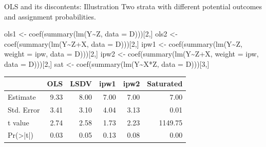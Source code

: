 \documentclass[
  11pt,
  ignorenonframetext,
]{beamer}
\newenvironment{Shaded}{\begin{snugshade}}{\end{snugshade}}
\newcommand{\AttributeTok}[1]{\textcolor[rgb]{0.40,0.45,0.13}{#1}}
\newcommand{\DecValTok}[1]{\textcolor[rgb]{0.68,0.00,0.00}{#1}}
\newcommand{\FunctionTok}[1]{\textcolor[rgb]{0.28,0.35,0.67}{#1}}
\newcommand{\NormalTok}[1]{\textcolor[rgb]{0.00,0.23,0.31}{#1}}
\newcommand{\OtherTok}[1]{\textcolor[rgb]{0.00,0.23,0.31}{#1}}
\newcommand{\SpecialCharTok}[1]{\textcolor[rgb]{0.37,0.37,0.37}{#1}}
\begin{document}
\begin{frame}[fragile]{OLS and its discontents: Illustration}
\protect\hypertarget{ols-and-its-discontents-illustration-2}{}
Two strata with different potential outcomes and assignment
probabilities.

\begin{Shaded}
\begin{Highlighting}[]
\NormalTok{ols1 }\OtherTok{\textless{}{-}} \FunctionTok{coef}\NormalTok{(}\FunctionTok{summary}\NormalTok{(}\FunctionTok{lm}\NormalTok{(Y}\SpecialCharTok{\textasciitilde{}}\NormalTok{Z, }\AttributeTok{data =}\NormalTok{ D)))[}\DecValTok{2}\NormalTok{,]}
\NormalTok{ols2 }\OtherTok{\textless{}{-}} \FunctionTok{coef}\NormalTok{(}\FunctionTok{summary}\NormalTok{(}\FunctionTok{lm}\NormalTok{(Y}\SpecialCharTok{\textasciitilde{}}\NormalTok{Z}\SpecialCharTok{+}\NormalTok{X, }\AttributeTok{data =}\NormalTok{ D)))[}\DecValTok{2}\NormalTok{,]}
\NormalTok{ipw1 }\OtherTok{\textless{}{-}} \FunctionTok{coef}\NormalTok{(}\FunctionTok{summary}\NormalTok{(}\FunctionTok{lm}\NormalTok{(Y}\SpecialCharTok{\textasciitilde{}}\NormalTok{Z, }\AttributeTok{weight =}\NormalTok{ ipw, }\AttributeTok{data =}\NormalTok{ D)))[}\DecValTok{2}\NormalTok{,]}
\NormalTok{ipw2 }\OtherTok{\textless{}{-}} \FunctionTok{coef}\NormalTok{(}\FunctionTok{summary}\NormalTok{(}\FunctionTok{lm}\NormalTok{(Y}\SpecialCharTok{\textasciitilde{}}\NormalTok{Z}\SpecialCharTok{+}\NormalTok{X, }\AttributeTok{weight =}\NormalTok{ ipw, }\AttributeTok{data =}\NormalTok{ D)))[}\DecValTok{2}\NormalTok{,]}
\NormalTok{sat  }\OtherTok{\textless{}{-}} \FunctionTok{coef}\NormalTok{(}\FunctionTok{summary}\NormalTok{(}\FunctionTok{lm}\NormalTok{(Y}\SpecialCharTok{\textasciitilde{}}\NormalTok{X}\SpecialCharTok{*}\NormalTok{Z, }\AttributeTok{data =}\NormalTok{ D)))[}\DecValTok{3}\NormalTok{,]}
\end{Highlighting}
\end{Shaded}

\begin{tabular}{l|r|r|r|r|r}
\hline
  & OLS & LSDV & ipw1 & ipw2 & Saturated\\
\hline
Estimate & 9.33 & 8.00 & 7.00 & 7.00 & 7.00\\
\hline
Std. Error & 3.41 & 3.10 & 4.04 & 3.13 & 0.01\\
\hline
t value & 2.74 & 2.58 & 1.73 & 2.23 & 1149.75\\
\hline
Pr(>|t|) & 0.03 & 0.05 & 0.13 & 0.08 & 0.00\\
\hline
\end{tabular}
\end{frame}
\end{document}
